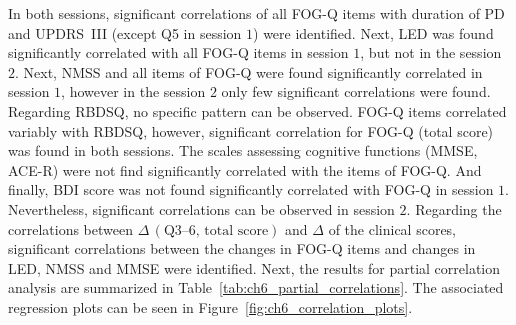 In both sessions, significant correlations of all FOG-Q items with duration of PD and UPDRS~III (except Q5 in session $1$) were identified. Next, LED was found significantly correlated with all FOG-Q items in session $1$, but not in the session $2$. Next, NMSS and all items of FOG-Q were found significantly correlated in session $1$, however in the session $2$ only few significant correlations were found. Regarding RBDSQ, no specific pattern can be observed. FOG-Q items correlated variably with RBDSQ, however, significant correlation for FOG-Q (total score) was found in both sessions. The scales assessing cognitive functions (MMSE, ACE-R) were not find significantly correlated with the items of FOG-Q. And finally, BDI score was not found significantly correlated with FOG-Q in session $1$. Nevertheless, significant correlations can be observed in session $2$. Regarding the correlations between $\Delta\,(\mbox{Q3--6, total score})$ and $\Delta$ of the clinical scores, significant correlations between the changes in FOG-Q items and changes in LED, NMSS and MMSE were identified. Next, the results for partial correlation analysis are summarized in Table~\ref{tab:ch6_partial_correlations}. The associated regression plots can be seen in Figure~\ref{fig:ch6_correlation_plots}.

